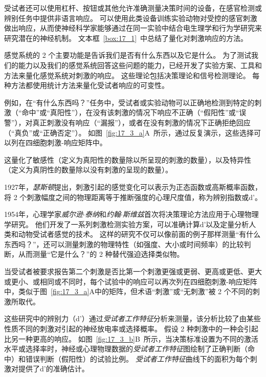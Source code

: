 受试者还可以使用杠杆、按钮或其他允许准确测量决策时间的设备，在感官检测或辨别任务中提供非语言响应。 
可以使用此类设备训练实验动物对受控的感官刺激做出响应，从而使神经科学家能够通过在同一实验中结合电生理学和行为学研究来研究潜在的神经机制。
文本框~\ref{box:17_1}~中总结了量化对刺激响应的方法。


\begin{proposition} \label{box:17_1}
	
	\quad \quad 感觉系统的 2 个主要功能是告诉我们是否有什么东西以及它是什么。
	为了测试我们的能力以及我们的感觉系统回答这些问题的能力，已经开发了实验方案、工具和方法来量化感觉系统对刺激的响应。
	这些理论包括决策理论和信号检测理论。
	每种方法都使用统计方法来量化受试者响应的可变性。
	
	\quad \quad 例如，在“有什么东西吗？”任务中，受试者或实验动物可以正确地检测到特定的刺激（“命中”或“真阳性”），在没有该刺激的情况下响应不正确（“假阳性”或“误警”），对真正刺激没有响应（“漏报”），或者在没有刺激的情况下正确拒绝回应（“真负”或“正确否定”）。
	如图~\ref{fig:17_3_a}A~所示，通过反复演示，这些选择可以列在四细胞刺激-响应矩阵中。
	
	\quad \quad 这量化了敏感性（定义为真阳性的数量除以所呈现的刺激的数量），以及特异性（定义为真阴性的数量除以没有刺激的呈现的数量）。
	
	\quad \quad 1927年，\textit{瑟斯顿}提出，刺激引起的感觉变化可以表示为正态函数或高斯概率函数，将 2 个刺激幅度之间的物理距离等于推断强度的心理尺度值，称为辨别指数或d'。
	
	\quad \quad 1954年，心理学家\textit{威尔逊$\cdot$泰纳}和\textit{约翰$\cdot$斯维兹}首次将决策理论方法应用于心理物理学研究。
	他们开发了一系列刺激检测实验方案，可以准确计算d'以及定量分析人类和动物受试者感觉的技术。
	这样的研究不仅可以像前面的例子那样测量“有什么东西吗？”，还可以测量刺激的物理特性（如强度、大小或时间频率）的比较判断，从而测量“它是什么？”的 2 种替代强迫选择类似物。
	
	\quad \quad 当受试者被要求报告第二个刺激是否比第一个刺激更强或更弱、更高或更低、更大或更小、或相同或不同时，每个试验中的响应可以再次列在四细胞刺激-响应矩阵中，类似于图~\ref{fig:17_3_a}A中的矩阵，但术语“刺激”或“无刺激”被 2 个不同的刺激所取代。
	
	\quad \quad 这些研究中的辨别力（d'）通过\textit{受试者工作特征}分析来测量，该分析比较了由某些性质不同的刺激对引起的神经放电率或选择概率。
	假设 2 种刺激中的一种会引起比另一种更高的响应。
	如图~\ref{fig:17_3_b}B~所示，当决策标准设置为不同的激活水平或选择率时，神经或心理物理数据的\textit{受试者工作特征}图绘制了正确判断（命中）和错误判断（假阳性）的试验比例。
	\textit{受试者工作特征}曲线下的面积为每个刺激对提供了d'的准确估计。
	

\end{proposition}
